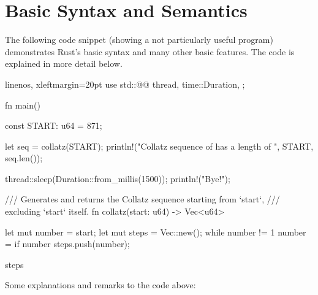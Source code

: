 \vspace{5mm}
\section{Basic Syntax and Semantics}

The following code snippet (showing a not particularly useful program) demonstrates Rust's basic syntax and many other basic features.
The code is explained in more detail below.

\begin{rustcode*}{linenos, xleftmargin=20pt}
use std::{@@
    thread,
    time::Duration,
};

fn main() {
    const START: u64 = 871;

    let seq = collatz(START);
    println!("Collatz sequence of {} has a length of {}", START, seq.len());

    thread::sleep(Duration::from_millis(1500));
    println!("Bye!");
}

/// Generates and returns the Collatz sequence starting from `start`,
/// excluding `start` itself.
fn collatz(start: u64) -> Vec<u64> {
    let mut number = start;
    let mut steps = Vec::new();
    while number != 1 {
        number = if number %
        steps.push(number);
    }

    steps
}
\end{rustcode*}

\vspace{-1mm}
Some explanations and remarks to the code above:

